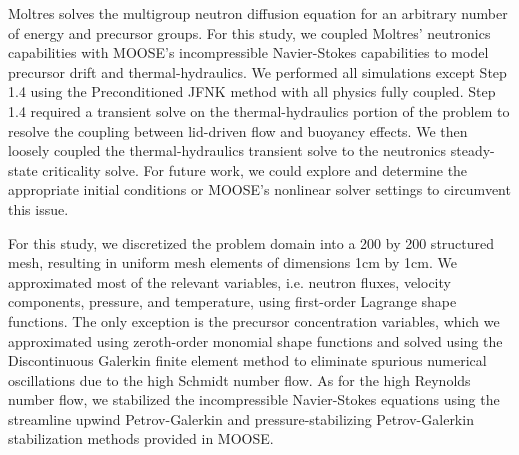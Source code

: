 Moltres solves the multigroup neutron diffusion equation for an arbitrary
number of energy and precursor groups. For this study, we coupled Moltres'
neutronics capabilities with \gls{MOOSE}'s incompressible Navier-Stokes
capabilities \cite{peterson_overview_2017} to
model precursor drift and thermal-hydraulics. We performed all simulations
except Step 1.4 using the Preconditioned \gls{JFNK} method with all physics
fully coupled. Step 1.4 required a transient solve on the thermal-hydraulics
portion of the problem to resolve the coupling between lid-driven flow and
buoyancy effects. We then loosely coupled the thermal-hydraulics transient
solve to the neutronics steady-state criticality solve. For future work, we
could explore and determine the appropriate initial conditions or \gls{MOOSE}'s
nonlinear solver settings to circumvent this issue.

For this study, we discretized the problem domain into a 200 by 200 structured
mesh, resulting in uniform mesh elements of dimensions 1cm by 1cm. We
approximated most of the relevant variables, i.e. neutron fluxes, velocity
components, pressure, and temperature, using first-order Lagrange shape
functions. The only exception is the precursor concentration variables, which
we approximated using zeroth-order monomial shape functions and solved using
the Discontinuous Galerkin finite element method to eliminate spurious
numerical oscillations due to the high Schmidt number flow. As for the high
Reynolds number flow, we stabilized the incompressible Navier-Stokes equations
using the streamline upwind Petrov-Galerkin and pressure-stabilizing
Petrov-Galerkin stabilization methods \cite{peterson_overview_2017} provided in
\gls{MOOSE}.